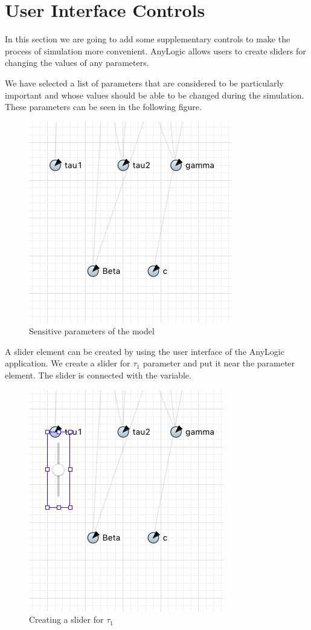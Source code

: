\section{User Interface Controls}

In this section we are going to add some supplementary controls to make the process of simulation more convenient. AnyLogic allows users to create sliders for changing the values of any parameters.

We have selected a list of parameters that are considered to be particularly important and whose values should be able to be changed during the simulation. These parameters can be seen in the following figure.

\begin{figure}[H]
  \centering
  \includegraphics[height=0.4\textwidth]{img/screens/sliders/sliders1}
  \caption{Sensitive parameters of the model}
\end{figure}

A slider element can be created by using the user interface of the AnyLogic application. We create a slider for $\tau_1$ parameter and put it near the parameter element. The slider is connected with the variable.

\begin{figure}[H]
  \centering
  \includegraphics[height=0.4\textwidth]{img/screens/sliders/sliders2}
  \caption{Creating a slider for $\tau_1$}
\end{figure}

